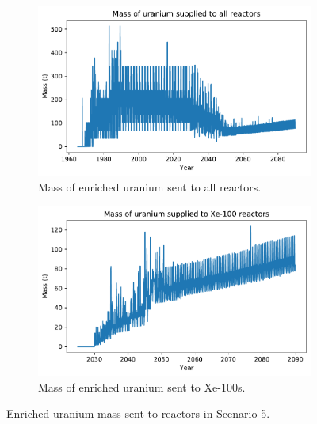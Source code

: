 \begin{figure}
    \centering
    \begin{subfigure}{0.45\textwidth}
        \centering
        \includegraphics[scale=0.4]{../figures/fuelsupply_scenarios_5.pdf}
        \caption{Mass of enriched uranium sent to all reactors.}
        \label{fig:totalfuel_5}
    \end{subfigure}
    \hspace{0.8cm}
    \begin{subfigure}{0.45\textwidth}
        \centering
        \includegraphics[scale=0.4]{../figures/advancedRX_fuelsupply_scenarios_5.pdf}
        \caption{Mass of enriched uranium sent to Xe-100s.}
        \label{fig:haleu_5}
    \end{subfigure}
    \caption{Enriched uranium mass sent to reactors in Scenario 5.}
    \label{fig:fuel_5}
\end{figure}

